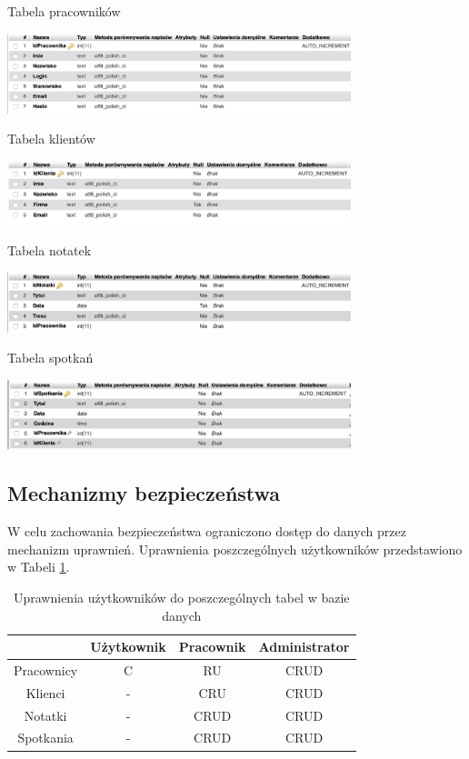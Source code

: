 \documentclass[eng,printmode,openany,oneside]{mgr}
\begin{document}
\begin{table}[H]
	\centering
	\caption{Tabela pracowników}
	\includegraphics[width=0.75\textwidth]{pracownik}
	\label{tab:1}
\end{table}

\begin{table}[H]
	\centering
	\caption{Tabela klientów}
	\includegraphics[width=0.75\textwidth]{klienci}
	\label{tab:2}
\end{table}

\begin{table}[H]
	\centering
	\caption{Tabela notatek}
	\includegraphics[width=0.75\textwidth]{tabelanotatki}
	\label{tab:3}
\end{table}

\begin{table}[H]
	\centering
	\caption{Tabela spotkań}
	\includegraphics[width=0.75\textwidth]{spotkania}
	\label{tab:4}
\end{table}


\subsection*{Mechanizmy bezpieczeństwa}

W celu zachowania bezpieczeństwa ograniczono dostęp do danych przez mechanizm uprawnień. Uprawnienia poszczególnych użytkowników przedstawiono w Tabeli \ref{tab:5}.
\begin{table}[H]
	\centering
	
	\caption{Uprawnienia użytkowników do poszczególnych tabel w bazie danych}


	\begin{tabular}{c|c|c|c} 
	 & Użytkownik & Pracownik & Administrator \\ \hline
	Pracownicy & C & RU & CRUD \\ \hline
	Klienci & - & CRU & CRUD \\ \hline
	Notatki & - &CRUD & CRUD \\ \hline
	Spotkania & - & CRUD & CRUD 

	\end{tabular}
	\label{tab:5}
\end{table}
\end{document}
